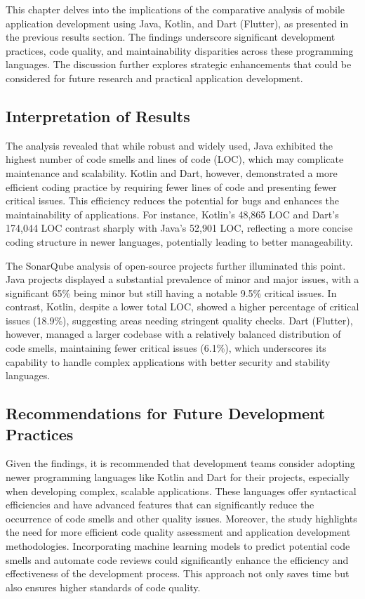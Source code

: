 This chapter delves into the implications of the comparative analysis of mobile application development using Java, Kotlin, and Dart (Flutter), as presented in the previous results section. The findings underscore significant development practices, code quality, and maintainability disparities across these programming languages. The discussion further explores strategic enhancements that could be considered for future research and practical application development.
\subsection{Interpretation of Results}
The analysis revealed that while robust and widely used, Java exhibited the highest number of code smells and lines of code (LOC), which may complicate maintenance and scalability. Kotlin and Dart, however, demonstrated a more efficient coding practice by requiring fewer lines of code and presenting fewer critical issues. This efficiency reduces the potential for bugs and enhances the maintainability of applications. For instance, Kotlin's 48,865 LOC and Dart's 174,044 LOC contrast sharply with Java's 52,901 LOC, reflecting a more concise coding structure in newer languages, potentially leading to better manageability.
\par
The SonarQube analysis of open-source projects further illuminated this point. Java projects displayed a substantial prevalence of minor and major issues, with a significant 65\% being minor but still having a notable 9.5\% critical issues. In contrast, Kotlin, despite a lower total LOC, showed a higher percentage of critical issues (18.9\%), suggesting areas needing stringent quality checks. Dart (Flutter), however, managed a larger codebase with a relatively balanced distribution of code smells, maintaining fewer critical issues (6.1\%), which underscores its capability to handle complex applications with better security and stability languages.
\subsection{Recommendations for Future Development Practices}
Given the findings, it is recommended that development teams consider adopting newer programming languages like Kotlin and Dart for their projects, especially when developing complex, scalable applications. These languages offer syntactical efficiencies and have advanced features that can significantly reduce the occurrence of code smells and other quality issues.
Moreover, the study highlights the need for more efficient code quality assessment and application development methodologies. Incorporating machine learning models to predict potential code smells and automate code reviews could significantly enhance the efficiency and effectiveness of the development process. This approach not only saves time but also ensures higher standards of code quality.

